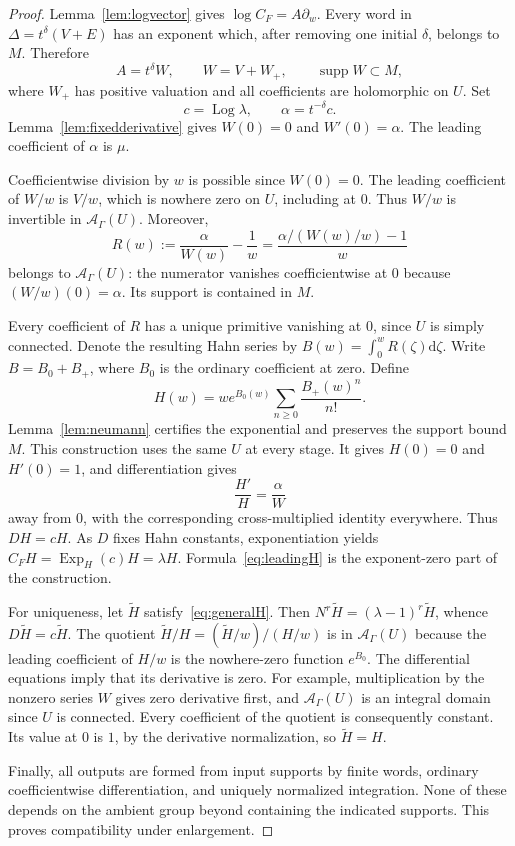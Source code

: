 \documentclass[11pt,a4paper]{article}
\numberwithin{equation}{section}
\theoremstyle{definition}
\theoremstyle{remark}
\newcommand{\A}{\mathscr A_\Gamma}
\newcommand{\dd}{\mathrm d}
\newcommand{\supp}{\operatorname{supp}}
\newcommand{\Log}{\operatorname{Log}}
\newcommand{\ExpH}{\operatorname{Exp}_{\!H}}
\begin{document}
\begin{proof}
Lemma~\ref{lem:logvector} gives $\log C_F=A\partial_w$.
Every word in $\Delta=t^\delta(V+E)$ has an exponent which, after removing
one initial $\delta$, belongs to $M$.  Therefore
\[
 A=t^\delta W,\qquad W=V+W_+,\qquad
 \supp W\subset M,
\]
where $W_+$ has positive valuation and all coefficients are holomorphic
on $U$.  Set
\[
 c=\Log\lambda,\qquad \alpha=t^{-\delta}c.
\]
Lemma~\ref{lem:fixedderivative} gives $W(0)=0$ and $W'(0)=\alpha$.
The leading coefficient of $\alpha$ is $\mu$.

Coefficientwise division by $w$ is possible since $W(0)=0$.
The leading coefficient of $W/w$ is $V/w$, which is nowhere zero on $U$,
including at $0$.  Thus $W/w$ is invertible in $\A(U)$.  Moreover,
\begin{equation}\label{eq:regularR}
 R(w):=\frac{\alpha}{W(w)}-\frac1w
   =\frac{\alpha/(W(w)/w)-1}{w}
\end{equation}
belongs to $\A(U)$: the numerator vanishes coefficientwise at $0$ because
$(W/w)(0)=\alpha$.  Its support is contained in $M$.

Every coefficient of $R$ has a unique primitive vanishing at $0$, since $U$
is simply connected.  Denote the resulting Hahn series by
$B(w)=\int_0^w R(\zeta)\dd\zeta$.  Write $B=B_0+B_+$, where $B_0$ is the
ordinary coefficient at zero.  Define
\begin{equation}\label{eq:Hconstruction}
 H(w)=w e^{B_0(w)}\sum_{n\ge0}\frac{B_+(w)^n}{n!}.
\end{equation}
Lemma~\ref{lem:neumann} certifies the exponential and preserves the support
bound $M$.  This construction uses the same $U$ at every stage.  It gives
$H(0)=0$ and $H'(0)=1$, and differentiation gives
\[
 \frac{H'}H=\frac\alpha W
\]
away from $0$, with the corresponding cross-multiplied identity everywhere.
Thus $D H=cH$.  As $D$ fixes Hahn constants, exponentiation yields
$C_FH=\ExpH(c)H=\lambda H$.
Formula~\eqref{eq:leadingH} is the exponent-zero part of the construction.

For uniqueness, let $\widetilde H$ satisfy~\eqref{eq:generalH}.
Then $N^r\widetilde H=(\lambda-1)^r\widetilde H$, whence
$D\widetilde H=c\widetilde H$.  The quotient
$\widetilde H/H=(\widetilde H/w)/(H/w)$ is in $\A(U)$ because the leading
coefficient of $H/w$ is the nowhere-zero function $e^{B_0}$.
The differential equations imply that its derivative is zero.  For example,
multiplication by the nonzero series $W$ gives zero derivative first, and
$\A(U)$ is an integral domain since $U$ is connected.  Every coefficient of
the quotient is consequently constant.  Its value at $0$ is $1$, by the
derivative normalization, so $\widetilde H=H$.

Finally, all outputs are formed from input supports by finite words,
ordinary coefficientwise differentiation, and uniquely normalized
integration.  None of these depends on the ambient group beyond containing
the indicated supports.  This proves compatibility under enlargement.
\end{proof}
\end{document}
